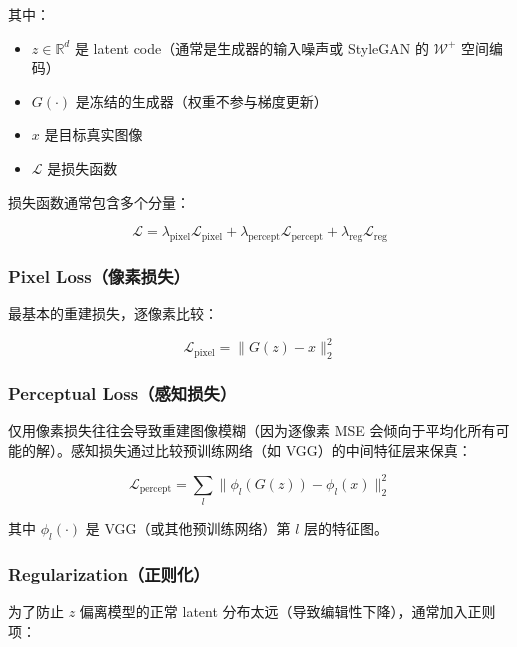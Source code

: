 \documentclass[11pt,a4paper]{article}
\theoremstyle{definition}
\newcommand{\R}{\mathbb{R}}
\begin{document}
其中：
\begin{itemize}
    \item $z \in \R^d$ 是 latent code（通常是生成器的输入噪声或 StyleGAN 的 $\mathcal{W}^+$ 空间编码）
    \item $G(\cdot)$ 是冻结的生成器（权重不参与梯度更新）
    \item $x$ 是目标真实图像
    \item $\mathcal{L}$ 是损失函数
\end{itemize}

损失函数通常包含多个分量：

\begin{equation}\label{eq:pivotal_loss}
    \mathcal{L} = \lambda_{\text{pixel}} \mathcal{L}_{\text{pixel}} + \lambda_{\text{percept}} \mathcal{L}_{\text{percept}} + \lambda_{\text{reg}} \mathcal{L}_{\text{reg}}
\end{equation}

\subsubsection{Pixel Loss（像素损失）}

最基本的重建损失，逐像素比较：

\begin{equation}\label{eq:pixel_loss}
    \mathcal{L}_{\text{pixel}} = \| G(z) - x \|_2^2
\end{equation}

\subsubsection{Perceptual Loss（感知损失）}

仅用像素损失往往会导致重建图像模糊（因为逐像素 MSE 会倾向于平均化所有可能的解）。感知损失通过比较预训练网络（如 VGG）的中间特征层来保真：

\begin{equation}\label{eq:perceptual_loss}
    \mathcal{L}_{\text{percept}} = \sum_{l} \big\| \phi_l(G(z)) - \phi_l(x) \big\|_2^2
\end{equation}

其中 $\phi_l(\cdot)$ 是 VGG（或其他预训练网络）第 $l$ 层的特征图。

\subsubsection{Regularization（正则化）}

为了防止 $z$ 偏离模型的正常 latent 分布太远（导致编辑性下降），通常加入正则项：
\end{document}
